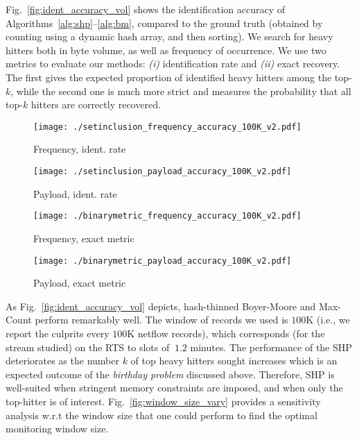\documentclass[10pt, conference, letterpaper,onecolumn]{IEEEtranv1.8}
\theoremstyle{plain}\newtheorem{thm}{Theorem}\newtheorem{lem}{Lemma}
\theoremstyle{definition}
\begin{document}
\smallskip
{} Fig.~\ref{fig:ident_accuracy_vol} shows the identification accuracy of 
Algorithms~\ref{alg:shp}--\ref{alg:bm}, compared to the ground truth (obtained by counting using a dynamic hash 
array, and then sorting). We search for heavy hitters both in byte volume, as well as frequency of occurrence. We 
use two metrics to evaluate our methods: {\em (i)} identification rate and {\it (ii)} exact recovery. 
The first gives the expected proportion of identified heavy hitters among the top-$k$, while the second one is much 
more strict and measures the probability that all top-$k$ hitters are correctly recovered. 

\begin{figure*}        
        \begin{subfigure}[b]{0.24\textwidth}
                \texttt{[image: ./setinclusion\_frequency\_accuracy\_100K\_v2.pdf]}
                \caption{\footnotesize Frequency, ident. rate}
                \label{fig:freq_set100}
        \end{subfigure}
        \begin{subfigure}[b]{0.24\textwidth}
                \texttt{[image: ./setinclusion\_payload\_accuracy\_100K\_v2.pdf]}
                \caption{\footnotesize Payload, ident. rate}
                \label{fig:payload_set100}
        \end{subfigure}
        \begin{subfigure}[b]{0.24\textwidth}
                \texttt{[image: ./binarymetric\_frequency\_accuracy\_100K\_v2.pdf]}
                \caption{\footnotesize Frequency, exact metric}
                \label{fig:freq_binary100}
        \end{subfigure}
        \begin{subfigure}[b]{0.24\textwidth}
                \texttt{[image: ./binarymetric\_payload\_accuracy\_100K\_v2.pdf]}
                \caption{\footnotesize Payload, exact metric}
                \label{fig:payload_binary100}
        \end{subfigure}
        \vspace{-5pt}
        \caption{\footnotesize Identification accuracy results (window=100K).}
                \label{fig:ident_accuracy_vol}
\end{figure*}

As Fig.~\ref{fig:ident_accuracy_vol} depicts, hash-thinned Boyer-Moore  and Max-Count perform remarkably well. 
The window of records we used is $100$K (i.e., we report the culprits every $100$K netflow records), which corresponds (for the stream studied)
on the RTS to slots of $~1.2$ minutes. The performance of the SHP
deteriorates as the number $k$ of top heavy hitters sought increases
which is an expected outcome of the \emph{birthday problem} discussed above.
Therefore, SHP is well-suited when stringent memory constraints are imposed,
and when only the top-hitter is of interest.
Fig.~\ref{fig:window_size_vary} provides a sensitivity analysis w.r.t the window size
that  one could perform to find the optimal monitoring window size.
\end{document}
